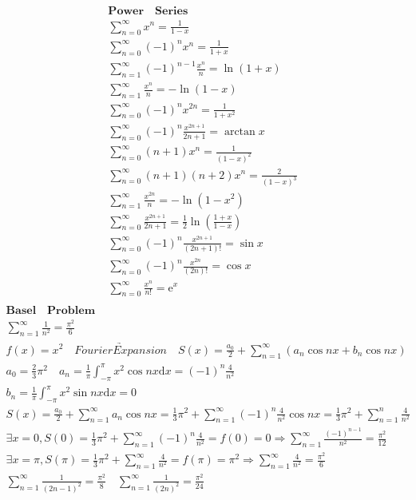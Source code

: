 \documentclass{article}
\begin{document}
\begin{align*}
    \bm{Power \quad Series} \\ 
    \sum_{n=0}^{\infty}{x^n} = \frac{1}{1-x} \\ 
    \sum_{n=0}^{\infty}{(-1)^nx^n} = \frac{1}{1+x} \\ 
    \sum_{n=1}^{\infty}{(-1)^{n-1}\frac{x^n}{n}} = \ln(1+x) \\ 
    \sum_{n=1}^{\infty}{\frac{x^n}{n}} = -\ln(1-x) \\ 
    \sum_{n=0}^{\infty}{(-1)^nx^{2n}} = \frac{1}{1+x^2} \\ 
    \sum_{n=0}^{\infty}{(-1)^{n}\frac{x^{2n+1}}{2n+1}} = \arctan x \\ 
    \sum_{n=0}^{\infty}{(n+1)x^n} = \frac{1}{(1-x)^2} \\ 
    \sum_{n=0}^{\infty}{(n+1)(n+2)x^n} = \frac{2}{(1-x)^3} \\
    \sum_{n=1}^{\infty}{\frac{x^{2n}}{n}} = -\ln(1-x^2) \\ 
    \sum_{n=0}^{\infty}{\frac{x^{2n+1}}{2n+1}} = \frac{1}{2}\ln(\frac{1+x}{1-x})\\  
    \sum_{n=0}^{\infty}{(-1)^{n} \frac{x^{2n+1}}{(2n+1)!}} = \sin x \\  
    \sum_{n=0}^{\infty}{(-1)^{n} \frac{x^{2n}}{(2n)!}} = \cos x \\  
    \sum_{n=0}^{\infty}{\frac{x^{n}}{n!}} =  \mathrm{e}^x \\ 
\end{align*}
\clearpage
\begin{align*}
    \bm{Basel \quad Problem} \\
    \sum_{n=1}^{\infty} \frac{1}{n^2} = \frac{\pi^2}{6} \\ 
    f(x) = x^2 \quad \underrightarrow{Fourier Expansion} \quad S(x) = \frac{a_{0}}{2}+\sum_{n=1}^{\infty}\left(a_{n}\cos nx+b_{n}\cos nx \right) \\
    a_{0} = \frac{2}{3}\pi^{2} \quad a_{n} = \frac{1}{\pi}\int_{-\pi}^{\pi} x^2 \cos nx \mathrm{d}x = (-1)^{n}\frac{4}{n^2}\\
    b_{n} = \frac{1}{\pi}\int_{-\pi}^{\pi} x^2 \sin nx \mathrm{d}x = 0 \\     
    S(x) = \frac{a_{0}}{2}+\sum_{n=1}^{\infty}a_{n}\cos nx= \frac{1}{3}\pi^{2} + \sum_{n=1}^{\infty}(-1)^{n}\frac{4}{n^2}\cos nx = \frac{1}{3}\pi^{2} + \sum_{n=1}^n\frac{4}{n^2} \\
    \exists x = 0, S(0) = \frac{1}{3}\pi^{2} + \sum_{n=1}^{\infty}(-1)^{n}\frac{4}{n^2} = f(0) = 0 \Longrightarrow \sum_{n=1}^{\infty}\frac{(-1)^{n-1}}{n^2} = \frac{\pi^{2}}{12}\\
    \exists x = \pi, S(\pi) = \frac{1}{3}\pi^{2} + \sum_{n=1}^{\infty}\frac{4}{n^2} = f(\pi) = \pi^2 \Longrightarrow \sum_{n=1}^{\infty}\frac{4}{n^2} = \frac{\pi^{2}}{6} \\ 
    \sum_{n=1}^{\infty}\frac{1}{(2n-1)^2} = \frac{\pi^{2}}{8} \quad \sum_{n=1}^{\infty}\frac{1}{(2n)^2} = \frac{\pi^{2}}{24} \\  
\end{align*}
\end{document}
